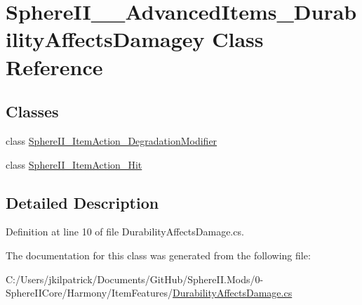 \hypertarget{class_sphere_i_i_____advanced_items___durability_affects_damagey}{}\section{Sphere\+I\+I\+\_\+\+\_\+\+Advanced\+Items\+\_\+\+Durability\+Affects\+Damagey Class Reference}
\label{class_sphere_i_i_____advanced_items___durability_affects_damagey}
\subsection*{Classes}
\begin{DoxyCompactItemize}
\item 
class \mbox{\hyperlink{class_sphere_i_i_____advanced_items___durability_affects_damagey_1_1_sphere_i_i___item_action___degradation_modifier}{Sphere\+I\+I\+\_\+\+Item\+Action\+\_\+\+Degradation\+Modifier}}
\item 
class \mbox{\hyperlink{class_sphere_i_i_____advanced_items___durability_affects_damagey_1_1_sphere_i_i___item_action___hit}{Sphere\+I\+I\+\_\+\+Item\+Action\+\_\+\+Hit}}
\end{DoxyCompactItemize}


\subsection{Detailed Description}


Definition at line 10 of file Durability\+Affects\+Damage.\+cs.



The documentation for this class was generated from the following file\+:\begin{DoxyCompactItemize}
\item 
C\+:/\+Users/jkilpatrick/\+Documents/\+Git\+Hub/\+Sphere\+I\+I.\+Mods/0-\/\+Sphere\+I\+I\+Core/\+Harmony/\+Item\+Features/\mbox{\hyperlink{_durability_affects_damage_8cs}{Durability\+Affects\+Damage.\+cs}}\end{DoxyCompactItemize}
